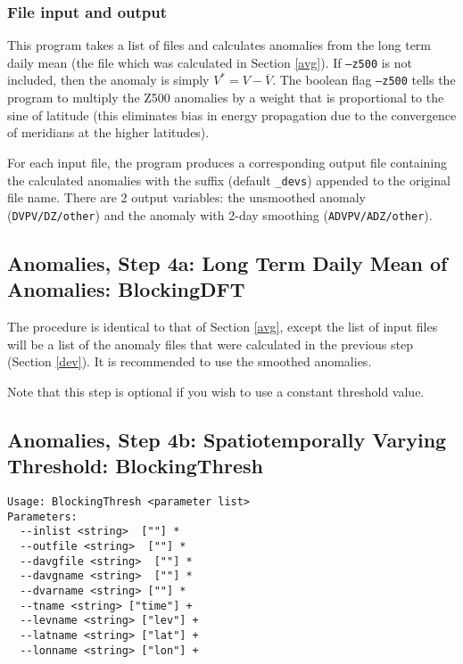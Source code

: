 \documentclass{article}
\begin{document}
\subsubsection{File input and output}
This program takes a list of files and calculates anomalies from the long term daily mean (the file which was calculated in Section \ref{avg}). If \texttt{--z500} is not included, then the anomaly is simply $V^*=V-\overline{V}$. The boolean flag \texttt{--z500} tells the program to multiply the Z500 anomalies by a weight that is proportional to the sine of latitude (this eliminates bias in energy propagation due to the convergence of meridians at the higher latitudes).

For each input file, the program produces a corresponding output file containing the calculated anomalies with the suffix (default \texttt{\_devs}) appended to the original file name. There are 2 output variables: the unsmoothed anomaly (\texttt{DVPV/DZ/other}) and  the anomaly with 2-day smoothing (\texttt{ADVPV/ADZ/other}).


\subsection{Anomalies, Step 4a: Long Term Daily Mean of Anomalies: BlockingDFT}\label{davg}

The procedure is identical to that of Section \ref{avg}, except the list of input files will be a list of the anomaly files that were calculated in the previous step (Section \ref{dev}). It is recommended to use the smoothed anomalies.

Note that this step is optional if you wish to use a constant threshold value.

\subsection{Anomalies, Step 4b: Spatiotemporally Varying Threshold: BlockingThresh}\label{thresh}

\begin{verbatim}
Usage: BlockingThresh <parameter list>
Parameters:
  --inlist <string>  [""] *
  --outfile <string>  [""] *
  --davgfile <string>  [""] *
  --davgname <string>  [""] *
  --dvarname <string> [""] *
  --tname <string> ["time"] +
  --levname <string> ["lev"] +
  --latname <string> ["lat"] +
  --lonname <string> ["lon"] +
\end{verbatim}
\end{document}
